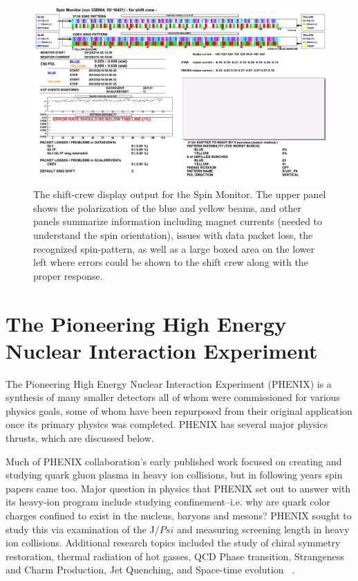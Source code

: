 \begin{figure}
  \centering
  \includegraphics[width=\linewidth]{./figures/SPINMON_shift_358904.png}
  \caption{
    The shift-crew display output for the Spin Monitor. The upper panel shows
    the polarization of the blue and yellow beams, and other panels summarize
    information including magnet currents (needed to understand the spin
    orientation), issues with data packet loss, the recognized spin-pattern, as
    well as a large boxed area on the lower left where errors could be shown to
    the shift crew along with the proper response.
  }
  \label{fig:spin_monitor}
\end{figure}

\clearpage
\section{The Pioneering High Energy Nuclear Interaction Experiment}
\label{sec:PHENIX}

The Pioneering High Energy Nuclear Interaction Experiment (PHENIX) is a
synthesis of many smaller detectors all of whom were commissioned for various
physics goals, some of whom have been repurposed from their original
application once its primary physics was completed. PHENIX has several major
physics thrusts, which are discussed below. 

Much of PHENIX collaboration's early published work focused on creating and
studying quark gluon plasma in heavy ion collisions, but in following years
spin papers came too. Major question in physics that PHENIX set out to answer
with its heavy-ion program include studying confinement--i.e.  why are quark
color charges confined to exist in the nucleus, baryons and mesons? PHENIX
sought to study this via examination of the J/$Psi$ and measuring screening
length in heavy ion collisions. Additional research topics included the study
of chiral symmetry restoration, thermal radiation of hot gasses, QCD Phase
transition, Strangeness and Charm Production, Jet Quenching, and Space-time
evolution~\cite{Nagamiya1994} .

